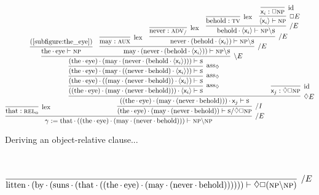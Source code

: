 \begin{figure}
	\centering
	\begin{subfigure}{1\textwidth}
		\smaller
		\[
			\infer[\divright E]{\gamma := \w{that}\sbind((\w{the}\sbind\w{eye})\sbind(\w{may}\sbind(\w{never}\sbind\w{behold}))) \vdash \np\divleft\np}{
				\infer[\Lex]{\w{that} : \subcat{l}{rel}{o}}{}
				&
				\hspace{-40pt}\infer[\divright I]{(\w{the}\sbind\w{eye})\sbind(\w{may}\sbind(\w{never}\sbind\w{behold})) \vdash \s\divright\diamond\Box\np}{
						\infer[\diamond E]{((\w{the}\sbind\w{eye})\sbind(\w{may}\sbind(\w{never}\sbind\w{behold})))\sbind\term{\varj}\vdash \s}{
							\infer[\rulestyle{ass}_{\diamond}]{((\w{the}\sbind\w{eye})\sbind(\w{may}\sbind(\w{never}\sbind\w{behold})))\sbind\bracket{\term{\vari }}\vdash \s}{
								\infer[\rulestyle{ass}_{\diamond}]{(\w{the}\sbind\w{eye})\sbind((\w{may}\sbind(\w{never}\sbind\w{behold}))\sbind\bracket{\term{\vari }})\vdash \s}{
									\infer[\rulestyle{ass}_{\diamond}]{(\w{the}\sbind\w{eye})\sbind(\w{may}\sbind((\w{never}\sbind\w{behold})\sbind\bracket{\term{\vari }}))\vdash \s}{
										\infer[\divleft E]{(\w{the}\sbind\w{eye})\sbind(\w{may}\sbind(\w{never}\sbind(\w{behold}\sbind\bracket{\term{\vari }})))\vdash \s}{
											\infer{\w{the}\sbind\w{eye} \vdash \np}{\text{(\ref{subfigure:the_eye})}}
											&
											\infer[\divright E]{\w{may}\sbind(\w{never}\sbind(\w{behold}\sbind\bracket{\term{\vari }})) \vdash \np\divleft\s}{
												\infer[\Lex]{\w{may} : \gtype{aux}}{}
												&
												\infer[\divright E]{\w{never}\sbind(\w{behold}\sbind\bracket{\term{\vari }}) \vdash \np\divleft\s}{
													\infer[\Lex]{\w{never}:\smallgtype{adv}_{\divright}}{}
													&
													\infer[\divright E]{\w{behold}\sbind{\bracket{\term{\vari }}} \vdash \np\divleft\s}{
														\infer[\Lex]{\w{behold}: \gtype[l]{tv}}{}
														&
														\infer[\Box E]{\bracket{\term{\vari }} \vdash \np}{
															\infer[\Ax]{\term{\vari } : \Box \np}{}
														}
													}
												}
											}
										}
									}
								}
							}						
							&
							\hspace{-52pt}
							\infer[\Ax]{\term{\varj}: \diamond\Box \np}{}
						}
					}
				}
		\]
		\caption{Deriving an object-relative clause...}
		\label{subfigure:lovecraft_rel_clause:rc}
	\end{subfigure}\\[\smallsep]
	\begin{subfigure}{1\textwidth}
		\smaller
		\[
			\infer[\divright E]{\w{litten}\sbind(\w{by}\sbind(\w{suns}\sbind(\w{that}\sbind((\w{the}\sbind\w{eye})\sbind(\w{may}\sbind(\w{never}\sbind\w{behold})))))) \vdash \diamond\Box(\np\divleft\np)}{
}\]
\end{subfigure}
\end{figure}
